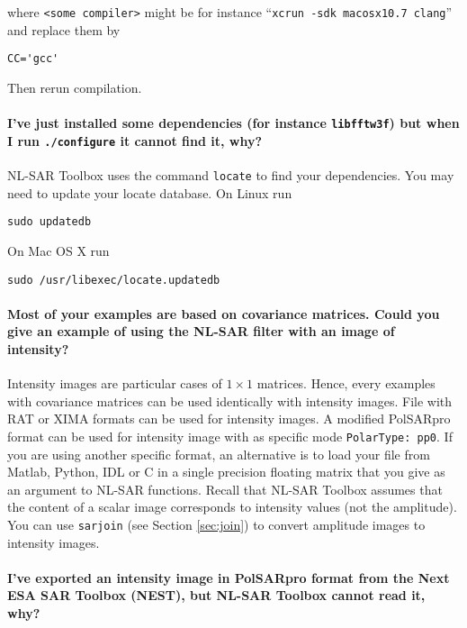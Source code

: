 \documentclass[10pt,french,english,a4paper]{article}
\begin{document}
where \texttt{<some compiler>} might be for instance ``\texttt{xcrun -sdk macosx10.7 clang}''
and replace them by

  \begin{Verbatim}[frame=single]
    CC='gcc'
  \end{Verbatim}

Then rerun compilation.

\paragraph{\bf I've just installed some dependencies (for instance \texttt{libfftw3f})
  but when I run \texttt{./configure} it cannot find it, why?}

NL-SAR Toolbox uses the command \texttt{locate} to find your dependencies.
You may need to update your locate database. On Linux run

  \begin{Verbatim}[frame=single]
    sudo updatedb
  \end{Verbatim}

On Mac OS X run

  \begin{Verbatim}[frame=single]
    sudo /usr/libexec/locate.updatedb
  \end{Verbatim}

\paragraph{\bf
Most of your examples are based on covariance matrices.
Could you give an example of using the NL-SAR filter with an image of intensity?}

Intensity images are particular cases of $1 \times 1$ matrices. Hence, every examples
with covariance matrices can be used identically with intensity images.
File with RAT or XIMA formats can be used for intensity images.
A modified PolSARpro format can be used for intensity image with
as specific mode \texttt{PolarType: pp0}.
If you are using another specific format, an alternative is to load your file
from Matlab, Python, IDL or C in a single precision floating matrix that you give as an argument
to NL-SAR functions.
Recall that NL-SAR Toolbox assumes that the content of a scalar image corresponds to
intensity values (not the amplitude). You can use
\texttt{sarjoin} (see Section \ref{sec:join}) to convert amplitude images
to intensity images.

\paragraph{\bf I've exported an intensity image in PolSARpro format
  from the Next ESA SAR Toolbox (NEST), but NL-SAR Toolbox cannot read it, why?}
\end{document}
